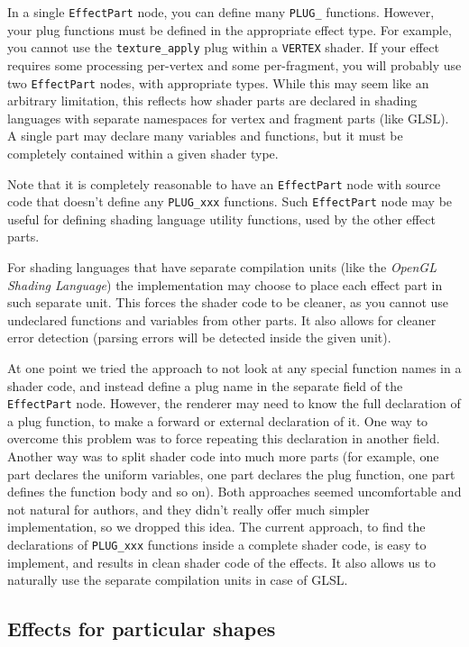 \documentclass{egpubl}
\begin{document}
In a single \texttt{EffectPart} node, you can define many \texttt{PLUG\_}
functions. However, your plug functions must be defined in the appropriate
effect type. For example, you cannot use the \texttt{texture\_apply} plug within
a \texttt{VERTEX} shader.
If your effect requires some processing per-vertex and some per-fragment,
you will probably use two \texttt{EffectPart} nodes, with appropriate types.
While this may seem like an arbitrary limitation,
this reflects how shader parts are declared in shading languages with
separate namespaces for vertex and fragment parts (like GLSL).
A single part may declare many variables and functions,
but it must be completely contained within a given shader type.

Note that it is completely reasonable to have an \texttt{EffectPart} node
with source code that doesn't define any \texttt{PLUG\_xxx} functions.
Such \texttt{EffectPart} node may be useful for defining shading language
utility functions, used by the other effect parts.

For shading languages that have separate compilation units
(like the \emph{OpenGL Shading Language}) the implementation may choose to place
each effect part in such separate unit. This forces the shader code to be
cleaner, as you cannot use undeclared functions and variables from other parts.
It also allows for cleaner error detection (parsing errors will be detected
inside the given unit).

At one point we tried the approach
to not look at any special function names in a shader code,
and instead define a plug name in the separate field of the \texttt{EffectPart}
node. However, the renderer may need to know the full declaration
of a plug function, to make a forward or external declaration of it.
One way to overcome this problem was to force repeating this declaration
in another field. Another way was to split shader code into much more
parts (for example, one part declares the uniform variables, one part declares
the plug function, one part defines the function body and so on).
Both approaches seemed uncomfortable and not natural for authors,
and they didn't really offer much simpler implementation, so we dropped this idea.
The current approach, to find the declarations of \texttt{PLUG\_xxx} functions
inside a complete shader code, is easy to implement, and results in clean
shader code of the effects. It also allows us to naturally use
the separate compilation units in case of GLSL.

\subsection{Effects for particular shapes}
\end{document}
